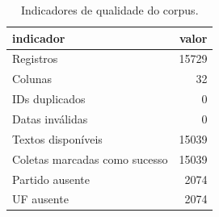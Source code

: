 \begin{table}
\caption{Indicadores de qualidade do corpus.}
\label{tab:qualidade}
\begin{tabular}{lr}
\toprule
indicador & valor \\
\midrule
Registros & 15729 \\
Colunas & 32 \\
IDs duplicados & 0 \\
Datas inválidas & 0 \\
Textos disponíveis & 15039 \\
Coletas marcadas como sucesso & 15039 \\
Partido ausente & 2074 \\
UF ausente & 2074 \\
\bottomrule
\end{tabular}
\end{table}

